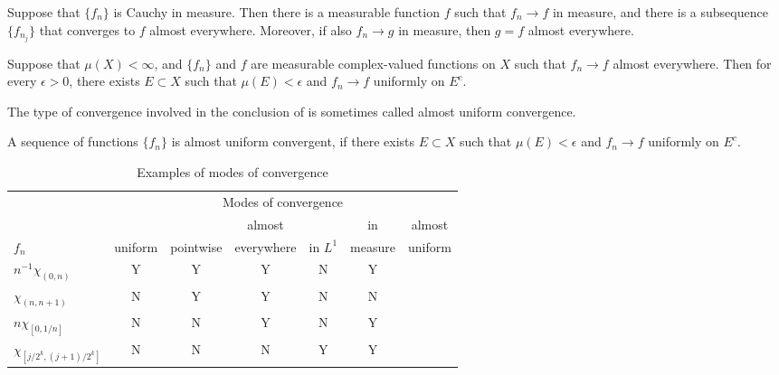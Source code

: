 \begin{theorem}
    Suppose that $\{ f_n \}$ is Cauchy in measure.
    Then there is a measurable function $f$ such that $f_n \to f$ in measure, and there is a subsequence $\{ f_{n_j} \}$ that converges to $f$ almost everywhere.
    Moreover, if also $f_n \to g$ in measure, then $g = f$ almost everywhere.
\end{theorem}

\begin{theorem}
    Suppose that $\mu(X) < \infty$, and $\{ f_n \}$ and $f$ are measurable complex-valued functions on $X$ such that $f_n \to f$ almost everywhere.
    Then for every $\epsilon > 0$, there exists $E \subset X$ such that $\mu(E) < \epsilon$ and $f_n \to f$ uniformly on $E^c$.
\end{theorem}

The type of convergence involved in the conclusion of  is sometimes called almost uniform convergence. 

\begin{definition}
    A sequence of functions $\{ f_n \}$ is almost uniform convergent, if there exists $E \subset X$ such that $\mu(E) < \epsilon$ and $f_n \to f$ uniformly on $E^c$.
\end{definition}

\begin{table*}[h!]
    \caption{Examples of modes of convergence}
    \begin{tabular}{lcccccc}
        \toprule 
                               & \multicolumn{6}{c}{Modes of convergence} \\
        \cmidrule(lr){2-7}
                               &         &           & almost     &          & in      & almost \\
        $f_n$                  & uniform & pointwise & everywhere & in $L^1$ & measure & uniform \\
        \midrule
        $n^{-1} \chi_{(0, n)}$ & Y       & Y         & Y          & N        & Y       &   \\
        $\chi_{(n, n+1)}$      & N       & Y         & Y          & N        & N       &   \\
        $n \chi_{[0, 1/n]}$    & N       & N         & Y          & N        & Y       &   \\
        $\chi_{[j/2^k, (j+1)/2^k]}$ & N  & N         & N          & Y        & Y       &   \\
        \bottomrule
    \end{tabular}
\end{table*}

